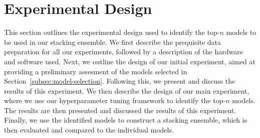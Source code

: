 \section{Experimental Design}\label{sec:methodology}
This section outlines the experimental design used to identify the top-$n$ models to be used in our stacking ensemble.
We first describe the prequisite data preparation for all our experiments, followed by a description of the hardware and software used.
Next, we outline the design of our initial experiment, aimed at providing a preliminary assesment of the models selected in Section~\ref{subsec:model-selection}.
Following this, we present and discuss the results of this experiment.
We then describe the design of our main experiment, where we use our hyperparameter tuning framework to identify the top-$n$ models.
The results are then presented and discussed the results of this experiment.
Finally, we use the identified models to construct a stacking ensemble, which is then evaluated and compared to the individual models.




